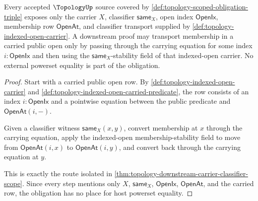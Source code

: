 \begin{theorem}
\label{thm:topology-obligation-carrier-classifier-scope}
Every accepted $\TopologyUp$ source covered by \autoref{def:topology-scoped-obligation-triple} exposes only the carrier $X$, classifier $\mathsf{same}_X$, open index $\mathsf{OpenIx}$, membership row $\mathsf{OpenAt}$, and classifier transport supplied by \autoref{def:topology-indexed-open-carrier}. A downstream proof may transport membership in a carried public open only by passing through the carrying equation for some index $i:\mathsf{OpenIx}$ and then using the $\mathsf{same}_X$-stability field of that indexed-open carrier. No external powerset equality is part of the obligation.
\end{theorem}
\begin{proof}
Start with a carried public open row. By \autoref{def:topology-indexed-open-carrier} and \autoref{def:topology-indexed-open-carried-predicate}, the row consists of an index $i:\mathsf{OpenIx}$ and a pointwise equation between the public predicate and $\mathsf{OpenAt}(i,-)$.

Given a classifier witness $\mathsf{same}_X(x,y)$, convert membership at $x$ through the carrying equation, apply the indexed-open membership-stability field to move from $\mathsf{OpenAt}(i,x)$ to $\mathsf{OpenAt}(i,y)$, and convert back through the carrying equation at $y$.

This is exactly the route isolated in \autoref{thm:topology-downstream-carrier-classifier-scope}. Since every step mentions only $X$, $\mathsf{same}_X$, $\mathsf{OpenIx}$, $\mathsf{OpenAt}$, and the carried row, the obligation has no place for host powerset equality.
\end{proof}

